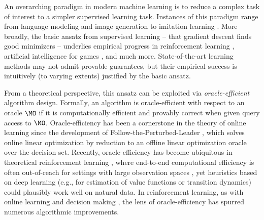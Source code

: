 
An overarching paradigm in modern machine learning is to reduce a complex task of interest to a simpler supervised learning task. Instances of this paradigm range from language modeling \citep{openai2023} and image generation \citep{song2019generative} to imitation learning \citep{bojarski2016end}. More broadly, the basic ansatz from supervised learning \--- that gradient descent finds good minimizers \--- underlies empirical progress in reinforcement learning \citep{mnih2015human}, artificial intelligence for games \citep{silver2018general}, and much more. State-of-the-art learning methods may not admit provable guarantees, but their empirical success is intuitively (to varying extents) justified by the basic ansatz.\loose

From a theoretical perspective, this ansatz can be exploited via \emph{oracle-efficient} algorithm design. Formally, an algorithm is oracle-efficient with respect to an oracle $\MO$ if it is computationally efficient and provably correct when given query access to $\MO$. Oracle-efficiency has been a cornerstone in the theory of online learning since the development of Follow-the-Perturbed-Leader \citep{kalai2005efficient}, which solves online linear optimization by reduction to an offline linear optimization oracle over the decision set. Recently, oracle-efficiency has become ubiquitous in theoretical reinforcement learning \citep{dann2018oracle,du2019provably,misra2020kinematic,foster2021statistical,mhammedi2023efficient,hussing2024oracle}, where end-to-end computational efficiency is often out-of-reach for settings with large observation spaces \citep{kane2022computational,golowich2024exploration}, yet heuristics based on deep learning (e.g., for estimation of value functions or transition dynamics) could plausibly work well on natural data. In reinforcement learning, as with online learning \citep{hazan2016computational,dudik2020oracle} and decision making \citep{agarwal2014taming,foster2020beyond}, the lens of oracle-efficiency has spurred numerous algorithmic improvements.

